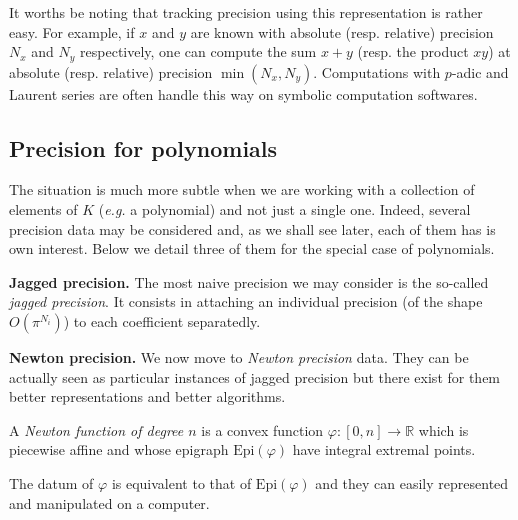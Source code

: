 \documentclass{sig-alternate-2013}
\newcommand{\R}{\mathbb R}
\newcommand{\Epi}{\textrm{Epi}}
\begin{document}
It worths be noting that tracking precision using this representation is 
rather easy. For example, if $x$ and $y$ are known with absolute (resp. 
relative) precision $N_x$ and $N_y$ respectively, one can compute the 
sum $x+y$ (resp. the product $xy$) at absolute (resp. relative) 
precision $\min(N_x,N_y)$. Computations with $p$-adic and Laurent
series are often handle this way on symbolic computation softwares.

\subsection{Precision for polynomials}

The situation is much more subtle when we are working with a collection 
of elements of $K$ (\emph{e.g.} a polynomial) and not just a single one.
Indeed, several precision data may be considered and, as we shall see
later, each of them has is own interest. Below we detail three of them
for the special case of polynomials.

\medskip

\noindent
{\bf Jagged precision.}
The most naive precision we may consider is the so-called \emph{jagged 
precision}. It consists in attaching an individual precision (of the
shape $O(\pi^{N_i})$) to each coefficient separatedly.

\medskip

\noindent
{\bf Newton precision.} 
We now move to \emph{Newton precision} data. They can be actually seen 
as particular instances of jagged precision but there exist for them 
better representations and better algorithms.

\begin{deftn}
A \emph{Newton function of degree $n$} is a convex function 
$\varphi : [0,n] \to \R$ which is piecewise affine and whose epigraph
$\Epi(\varphi)$ have integral extremal points.
\end{deftn}

\begin{rem}
The datum of $\varphi$ is equivalent to that of $\Epi(\varphi)$ and they 
can easily represented and manipulated on a computer.
\end{rem}
\end{document}
